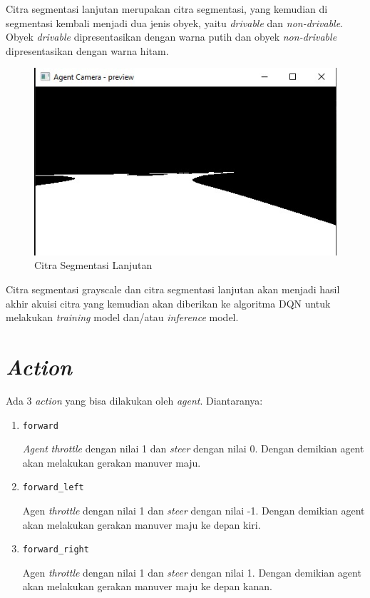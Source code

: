 Citra segmentasi lanjutan merupakan citra segmentasi, yang kemudian di segmentasi kembali menjadi dua jenis obyek, yaitu \textit{drivable }dan \textit{non-drivable}. Obyek \textit{drivable} dipresentasikan dengan warna putih dan obyek \textit{non-drivable} dipresentasikan dengan warna hitam.

\begin{figure}[H] 
	\centering
	\includegraphics[width=.7\linewidth]{images/segmentasi_hitam_putih}
	\caption{Citra Segmentasi Lanjutan}
	\label{fig:segmentasi_hitam_putih}
\end{figure}

Citra segmentasi grayscale dan citra segmentasi lanjutan akan menjadi hasil akhir akuisi citra yang kemudian akan diberikan ke algoritma DQN untuk melakukan \textit{training} model dan/atau \textit{inference} model.

\section{\textit{Action}}
\label{sec:action}
Ada 3 \textit{action} yang bisa dilakukan oleh \textit{agent}. Diantaranya:

\begin{enumerate}[nolistsep]
	\item \verb=forward=
	
	\textit{Agent} \textit{throttle} dengan nilai 1 dan \textit{steer} dengan nilai 0. Dengan demikian agent akan melakukan gerakan manuver maju.
	
	\item \verb=forward_left=
	
	Agen \textit{throttle} dengan nilai 1 dan \textit{steer} dengan nilai -1. Dengan demikian agent akan melakukan gerakan manuver maju ke depan kiri.

	\item \verb=forward_right=
	
	Agen \textit{throttle} dengan nilai 1 dan \textit{steer} dengan nilai 1. Dengan demikian agent akan melakukan gerakan manuver maju ke depan kanan.
	
\end{enumerate}


